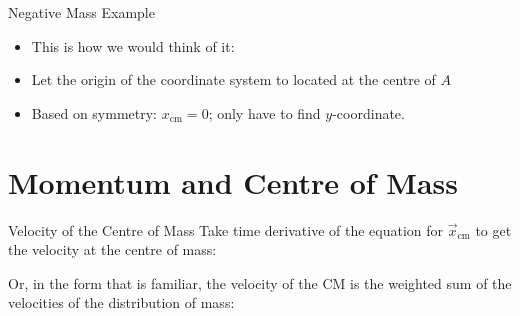 \documentclass[12pt,compress,aspectratio=169]{beamer}
\begin{document}
\begin{frame}{Negative Mass Example}
  \begin{itemize}
  \item This is how we would think of it:
    \begin{center}
    \end{center}
  \item Let the origin of the coordinate system to located at the centre of $A$
  \item Based on symmetry: $x_\text{cm}=0$; only have to find $y$-coordinate.
  \end{itemize}

\end{frame}



\section{Momentum and Centre of Mass}

\begin{frame}{Velocity of the Centre of Mass}
  Take time derivative of the equation for $\vec x_\text{cm}$ to get the
  velocity at the centre of mass:


  Or, in the form that is familiar, the velocity of the CM is the
  weighted sum of the velocities of the distribution of mass:
  
\end{frame}
\end{document}
